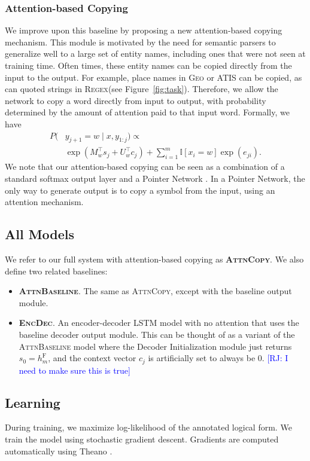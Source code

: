 \documentclass[11pt,letterpaper]{article}
\newcommand{\encdec}{\textsc{EncDec}\xspace}
\newcommand{\attn}{\textsc{AttnBaseline}\xspace}
\newcommand{\attncopy}{\textsc{AttnCopy}\xspace}
\newcommand{\atis}{\textsc{ATIS}\xspace}
\newcommand{\regex}{\textsc{Regex}\xspace}
\newcommand{\geo}{\textsc{Geo}\xspace}
\newcommand\rj[1]{\textcolor{blue}{[RJ: #1]}}
\begin{document}
\subsubsection{Attention-based Copying}
We improve upon this baseline by proposing a new 
attention-based copying mechanism.
This module is motivated by the need for semantic parsers
to generalize well to a large set of entity names,
including ones that were not seen at training time.
Often times, these entity names
can be copied directly from the input to the output.
For example, place names in \geo or \atis can be copied,
as can quoted strings in \regex (see Figure~\ref{fig:task}).
Therefore, we allow the network to copy a word directly from input to output,
with probability determined by the amount of attention paid to that input word.
Formally, we have
\begin{align}
  P(&y_{j+1} = w \mid x, y_{1:j}) \propto 
  \\ & \exp(M_{w}^\top s_j + U_w^\top c_j)
  + \sum_{i=1}^m \mathbb{I}[x_i = w] \exp(e_{ji}).
\end{align}
We note that our attention-based copying can be seen as a 
combination of a standard softmax output layer
and a Pointer Network \cite{vinyals2015pointer}.  In a Pointer Network,
the only way to generate output is to copy a symbol from the input,
using an attention mechanism.

\subsection{All Models}
We refer to our full system with attention-based copying as \textbf{\attncopy}.
We also define two related baselines:
\begin{itemize}
  \item \textbf{\attn}.  The same as \attncopy, except with the baseline 
    output module.
  \item \textbf{\encdec}.  An encoder-decoder LSTM model with no attention
    that uses the baseline decoder output module.  
    This can be thought of as a variant of the \attn model
    where the Decoder Initialization module
    just returns $s_0 = h_m^{\text{F}}$,
    and the context vector $c_j$ is artificially set to always be $0$.
    \rj{I need to make sure this is true}
\end{itemize}

\subsection{Learning}
During training, we maximize log-likelihood of the annotated logical form.
We train the model using stochastic gradient descent.
Gradients are computed automatically using Theano \cite{bergstra2010theano}.
\end{document}

